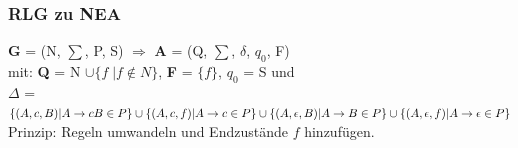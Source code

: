 \documentclass[12pt,a4paper]{article}
\begin{document}
	\subsubsection{RLG zu NEA}
	\textbf{G} = (N, $\sum$, P, S) $\Rightarrow$ \textbf{A} = (Q, $\sum$, $\delta$, $q_0$, F)  \\
	mit: \textbf{Q} = N $\cup\{f \; | f \notin N\}$, \textbf{F} = $\{f\}$, $q_0$ = S und\\
	$\Delta$ = $\{ (A, c, B) | A \rightarrow cB \in P\} \cup \\
	\{ (A, c, f) | A \rightarrow c \in P\} \cup \\
	\{ (A, \epsilon, B) | A \rightarrow B \in P\} \cup \\ 
	\{ (A, \epsilon, f) | A \rightarrow \epsilon \in P\}$
	Prinzip: Regeln umwandeln und Endzustände $f$ hinzufügen.
\end{document}

